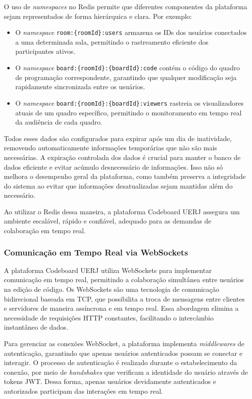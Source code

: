 O uso de \emph{namespaces} no Redis permite que diferentes componentes da plataforma sejam representados de forma hierárquica e clara. Por exemplo:
\begin{itemize}
    \item O \emph{namespace} \texttt{room:\{roomId\}:users} armazena os IDs dos usuários conectados a uma determinada sala, permitindo o rastreamento eficiente dos participantes ativos.
    \item O \emph{namespace} \texttt{board:\{roomId\}:\{boardId\}:code} contém o código do quadro de programação correspondente, garantindo que qualquer modificação seja rapidamente sincronizada entre os usuários.
    \item O \emph{namespace} \texttt{board:\{roomId\}:\{boardId\}:viewers} rastreia os visualizadores atuais de um quadro específico, permitindo o monitoramento em tempo real da audiência de cada quadro.
\end{itemize}

Todos esses dados são configurados para expirar após um dia de inatividade, removendo automaticamente informações temporárias que não são mais necessárias. A expiração controlada dos dados é crucial para manter o banco de dados eficiente e evitar acúmulo desnecessário de informações. Isso não só melhora o desempenho geral da plataforma, como também preserva a integridade do sistema ao evitar que informações desatualizadas sejam mantidas além do necessário.

Ao utilizar o Redis dessa maneira, a plataforma Codeboard UERJ assegura um ambiente escalável, rápido e confiável, adequado para as demandas de colaboração em tempo real.


\subsubsection{Comunicação em Tempo Real via WebSockets}

A plataforma Codeboard UERJ utiliza WebSockets para implementar comunicação em tempo real, permitindo a colaboração simultânea entre usuários na edição de código. Os WebSockets são uma tecnologia de comunicação bidirecional baseada em TCP, que possibilita a troca de mensagens entre clientes e servidores de maneira assíncrona e em tempo real. Essa abordagem elimina a necessidade de requisições HTTP constantes, facilitando o intercâmbio instantâneo de dados.

Para gerenciar as conexões WebSocket, a plataforma implementa \emph{middlewares} de autenticação, garantindo que apenas usuários autenticados possam se conectar e interagir. O processo de autenticação é realizado durante o estabelecimento da conexão, por meio de \emph{handshakes} que verificam a identidade do usuário através de tokens JWT. Dessa forma, apenas usuários devidamente autenticados e autorizados participam das interações em tempo real.

